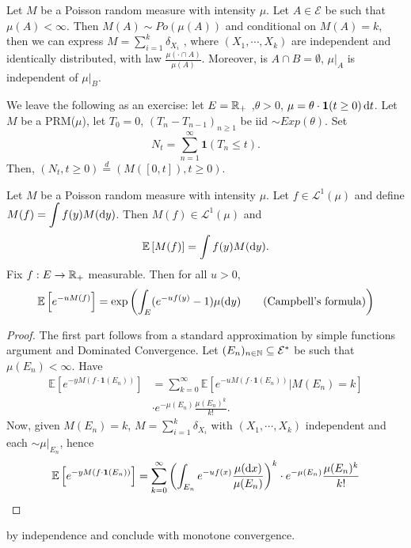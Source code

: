 \documentclass{article}
\begin{document}
\begin{boxprop}\label{prop: prm conditioning}
Let $ M$ be a Poisson random measure with intensity $ \mu$. Let $ A\in \mathcal{E}$ be such that $ \mu(A)<\infty$. Then $ M(A)\sim Po(\mu(A))$ and conditional on $ M(A) = k$, then we can express $ M  =\displaystyle\sum^{k}_{i=1} \delta_{X_{i}}$
, where $ (X_{1}, \cdots, X_{k})$ are independent and identically distributed, with law $ \frac{\mu(\cdot \cap A)}{\mu(A)}$. Moreover, is $ A\cap B = \emptyset$, $ \mu|_{A}$ is independent of $ \mu|_{B}$.
\end{boxprop}
	

We leave the following as an exercise: let $ E = \mathbb{R}_{+}$ ,$ \theta >0$, $ \mu = \theta\cdot \mathbf{1}(t\geq 0 ) \operatorname{d}\!  t$. Let $ M$ be a PRM($ \mu$), let $ T_{0}=0$, $ (T_{n}-T_{n-1})_{n\geq 1}$ be iid $ \sim Exp(\theta)$. Set 
\[
N_{t} =\displaystyle\sum^{\infty}_{n=1} \mathbf{1}(T_{n}\leq t). 
\]
Then, $ (N_{t}, t\geq 0) \stackrel{d}{=} (M([0,t]), t\geq 0)$.

\begin{theorem}\label{thm: integral wrt poisson random integral}
Let $ M$ be a Poisson random measure with intensity $ \mu$. Let $ f\in \mathcal{L}^{1}(\mu) $ and define $ M(f) = \displaystyle\int f(y) M(\operatorname{d}\! y)  $. Then $ M(f)\in \mathcal{L}^{1}(\mu) $ and 
\[
 \mathbb{E}\left[ M(f) \right] = \displaystyle\int f(y) M (\operatorname{d}\! y).   
\]
Fix $ f:E\to \mathbb{R}_{+}$ measurable. Then for all $ u>0$, 
\[
	\mathbb{E}\left[ e^{-uM(f)} \right] = \exp \left( \displaystyle\int_{E}(e^{-uf(y)}-1) \mu(\diff y)\tag{\text{Campbell's formula}}   \right)
\]

\end{theorem}

\begin{proof}
    The first part follows from a standard approximation by simple functions argument and Dominated Convergence. Let $ (E_{n})_{n\in \mathbb{N}}\subseteq  \mathcal{E}^{*}$ be such that $ \mu(E_{n})<\infty$. Have 
    \[
    \begin{array}{ll}
        \mathbb{E}\left[ e^{-yM(f\cdot \mathbf{1}(E_{n}))} \right] &=\displaystyle\sum^{\infty}_{k=0} \mathbb{E}\left[  e^{-uM(f\cdot \mathbf{1}(E_{n}))}| M(E_{n})=k \right]\\
         &\cdot e^{-\mu(E_{n})}\frac{\mu(E_{n})^{k}}{k!} .
    \end{array}
    \]
    Now, given $ M(E_{n}) = k$, $ M =\displaystyle\sum^{k}_{i=1}\delta_{X_{i}} $ with $ (X_{1}, \cdots, X_{k})$ independent and each $ \sim \mu|_{E_{n}}$, hence 
    \[\mathbb{E}\left[ e^{-yM(f\cdot \mathbf{1}(E_{n}))} \right] =\displaystyle\sum^{\infty}_{k=0} \left( \displaystyle\int_{E_{n}} e^{-uf(x)} \frac{\mu( \operatorname{d}\!  x)}{\mu(E_{n})}    \right)^k \cdot e^{-\mu(E_{n})}\frac{\mu(E_{n})^{k}}{k!}  \]
\end{proof}
\noindent by independence and conclude with monotone convergence.
\end{document}
